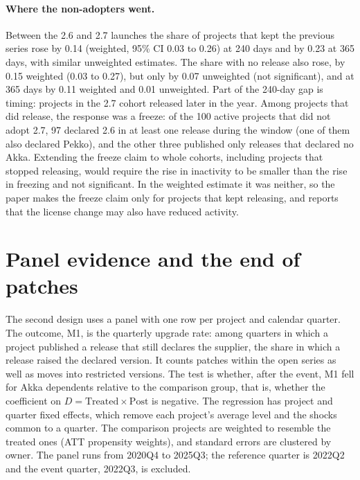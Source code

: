 \documentclass[11pt]{article}
\begin{document}
\paragraph{Where the non-adopters went.} Between the 2.6 and 2.7 launches the share of projects that kept the previous series rose by 0.14 (weighted, 95\% CI 0.03 to 0.26) at 240 days and by 0.23 at 365 days, with similar unweighted estimates. The share with no release also rose, by 0.15 weighted (0.03 to 0.27), but only by 0.07 unweighted (not significant), and at 365 days by 0.11 weighted and 0.01 unweighted. Part of the 240-day gap is timing: projects in the 2.7 cohort released later in the year. Among projects that did release, the response was a freeze: of the 100 active projects that did not adopt 2.7, 97 declared 2.6 in at least one release during the window (one of them also declared Pekko), and the other three published only releases that declared no Akka. Extending the freeze claim to whole cohorts, including projects that stopped releasing, would require the rise in inactivity to be smaller than the rise in freezing and not significant. In the weighted estimate it was neither, so the paper makes the freeze claim only for projects that kept releasing, and reports that the license change may also have reduced activity.

\section{Panel evidence and the end of patches}\label{sec:panel}

The second design uses a panel with one row per project and calendar quarter. The outcome, M1, is the quarterly upgrade rate: among quarters in which a project published a release that still declares the supplier, the share in which a release raised the declared version. It counts patches within the open series as well as moves into restricted versions. The test is whether, after the event, M1 fell for Akka dependents relative to the comparison group, that is, whether the coefficient on $D=\text{Treated}\times\text{Post}$ is negative. The regression has project and quarter fixed effects, which remove each project's average level and the shocks common to a quarter. The comparison projects are weighted to resemble the treated ones (ATT propensity weights), and standard errors are clustered by owner. The panel runs from 2020Q4 to 2025Q3; the reference quarter is 2022Q2 and the event quarter, 2022Q3, is excluded.
\end{document}
